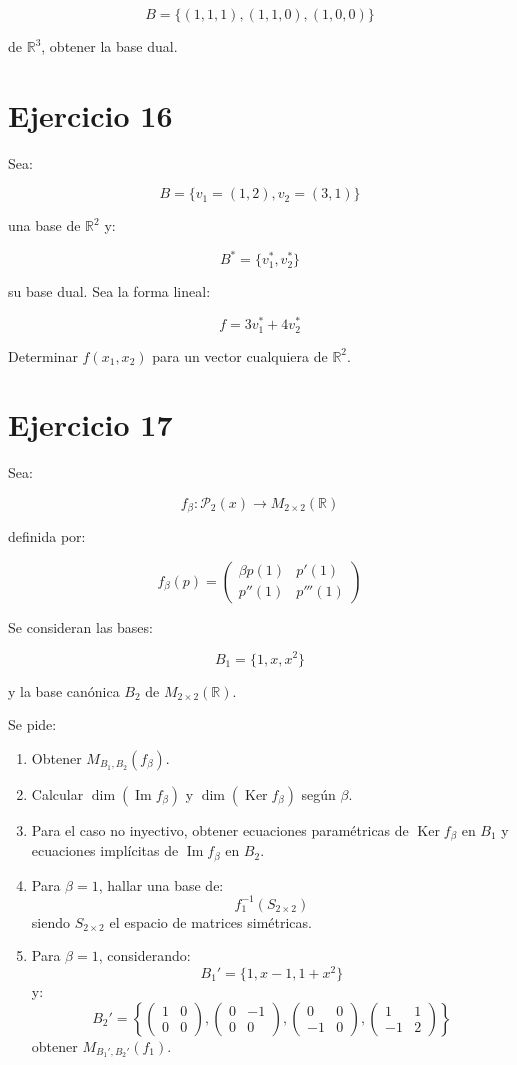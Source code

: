 \documentclass[11pt,a4paper]{article}
\newcommand{\R}{\mathbb{R}}
\newcommand{\Ker}{\operatorname{Ker}}
\newcommand{\Ima}{\operatorname{Im}}
\begin{document}
\[
B=
\{(1,1,1),(1,1,0),(1,0,0)\}
\]

de $\R^3$, obtener la base dual.

\section{Ejercicio 16}
Sea:

\[
B=
\{v_1=(1,2),v_2=(3,1)\}
\]

una base de $\R^2$ y:

\[
B^*=\{v_1^*,v_2^*\}
\]

su base dual. Sea la forma lineal:

\[
f=3v_1^*+4v_2^*
\]

Determinar $f(x_1,x_2)$ para un vector cualquiera de $\R^2$.

\section{Ejercicio 17}
Sea:

\[
f_\beta:\mathcal{P}_2(x)\longrightarrow M_{2\times2}(\R)
\]

definida por:

\[
f_\beta(p)
=
\begin{pmatrix}
\beta p(1)&p'(1)\\
p''(1)&p'''(1)
\end{pmatrix}
\]

Se consideran las bases:

\[
B_1=\{1,x,x^2\}
\]

y la base canónica $B_2$ de $M_{2\times2}(\R)$.

Se pide:

\begin{enumerate}[label=\alph*)]
	\item Obtener $M_{B_1,B_2}(f_\beta)$.
	\item Calcular $\dim(\Ima f_\beta)$ y $\dim(\Ker f_\beta)$ según $\beta$.
	\item Para el caso no inyectivo, obtener ecuaciones paramétricas de $\Ker f_\beta$ en $B_1$ y ecuaciones implícitas de $\Ima f_\beta$ en $B_2$.
	\item Para $\beta=1$, hallar una base de:
	\[
	f_1^{-1}(S_{2\times2})
	\]
	siendo $S_{2\times2}$ el espacio de matrices simétricas.
	\item Para $\beta=1$, considerando:
	\[
	B_1'=\{1,x-1,1+x^2\}
	\]
	y:
	\[
	B_2'=
	\left\{
	\begin{pmatrix}1&0\\0&0\end{pmatrix},
	\begin{pmatrix}0&-1\\0&0\end{pmatrix},
	\begin{pmatrix}0&0\\-1&0\end{pmatrix},
	\begin{pmatrix}1&1\\-1&2\end{pmatrix}
	\right\}
	\]
	obtener $M_{B_1',B_2'}(f_1)$.
\end{enumerate}
\end{document}
